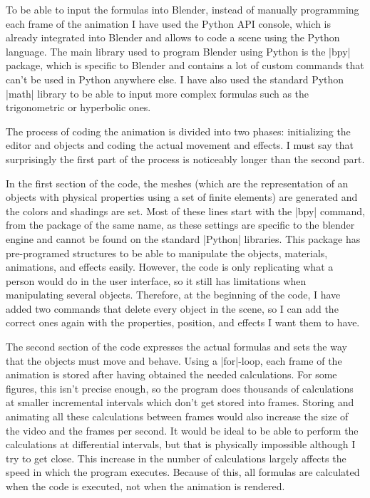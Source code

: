 \documentclass[12pt,twoside,a4paper]{article}
\begin{document}
	To be able to input the formulas into Blender, instead of manually programming each frame of the animation I have used the Python API console, which is already integrated into Blender and allows to code a scene using the Python language. The main library used to program Blender using Python is the \pyth|bpy| package, which is specific to Blender and contains a lot of custom commands that can't be used in Python anywhere else. I have also used the standard Python \pyth|math| library to be able to input more complex formulas such as the trigonometric or hyperbolic ones.
	
	The process of coding the animation is divided into two phases: initializing the editor and objects and coding the actual movement and effects. I must say that surprisingly the first part of the process is noticeably longer than the second part.
	
	In the first section of the code, the meshes (which are the representation of an objects with physical properties using a set of finite elements) are generated and the colors and shadings are set. Most of these lines start with the \pyth|bpy| command, from the package of the same name, as these settings are specific to the blender engine and cannot be found on the standard \pyth|Python| libraries. This package has pre-programed structures to be able to manipulate the objects, materials, animations, and effects easily. However, the code is only replicating what a person would do in the user interface, so it still has limitations when manipulating several objects. Therefore, at the beginning of the code, I have added two commands that delete every object in the scene, so I can add the correct ones again with the properties, position, and effects I want them to have.
	
	The second section of the code expresses the actual formulas and sets the way that the objects must move and behave. Using a \pyth|for|-loop, each frame of the animation is stored after having obtained the needed calculations. For some figures, this isn't precise enough, so the program does thousands of calculations at smaller incremental intervals which don't get stored into frames. Storing and animating all these calculations between frames would also increase the size of the video and the frames per second. It would be ideal to be able to perform the calculations at differential intervals, but that is physically impossible although I try to get close. This increase in the number of calculations largely affects the speed in which the program executes. Because of this, all formulas are calculated when the code is executed, not when the animation is rendered.
	
\end{document}
